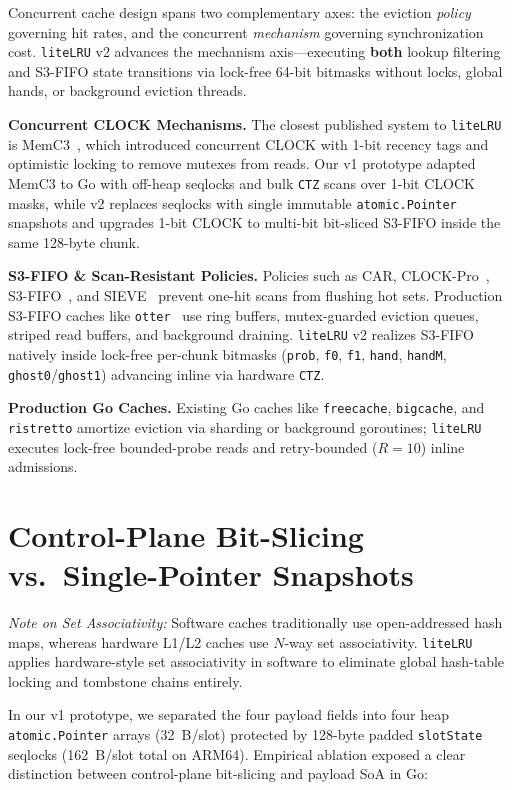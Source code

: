 \documentclass[11pt,a4paper]{article}
\begin{document}
Concurrent cache design spans two complementary axes: the eviction \textit{policy} governing hit rates, and the concurrent \textit{mechanism} governing synchronization cost. \texttt{liteLRU} v2 advances the mechanism axis---executing \textbf{both} lookup filtering and S3-FIFO state transitions via lock-free 64-bit bitmasks without locks, global hands, or background eviction threads.

\textbf{Concurrent CLOCK Mechanisms.} The closest published system to \texttt{liteLRU} is MemC3~\cite{memc3}, which introduced concurrent CLOCK with 1-bit recency tags and optimistic locking to remove mutexes from reads. Our v1 prototype adapted MemC3 to Go with off-heap seqlocks and bulk \texttt{CTZ} scans over 1-bit CLOCK masks, while v2 replaces seqlocks with single immutable \texttt{atomic.Pointer} snapshots and upgrades 1-bit CLOCK to multi-bit bit-sliced S3-FIFO inside the same 128-byte chunk.

\textbf{S3-FIFO \& Scan-Resistant Policies.} Policies such as CAR, CLOCK-Pro~\cite{clockpro2005}, S3-FIFO~\cite{s3fifo2023}, and SIEVE~\cite{sieve2024} prevent one-hit scans from flushing hot sets. Production S3-FIFO caches like \texttt{otter}~\cite{otter} use ring buffers, mutex-guarded eviction queues, striped read buffers, and background draining. \texttt{liteLRU} v2 realizes S3-FIFO natively inside lock-free per-chunk bitmasks (\texttt{prob}, \texttt{f0}, \texttt{f1}, \texttt{hand}, \texttt{handM}, \texttt{ghost0}/\texttt{ghost1}) advancing inline via hardware \texttt{CTZ}.

\textbf{Production Go Caches.} Existing Go caches like \texttt{freecache}, \texttt{bigcache}, and \texttt{ristretto} amortize eviction via sharding or background goroutines; \texttt{liteLRU} executes lock-free bounded-probe reads and retry-bounded ($R=10$) inline admissions.

\section{Control-Plane Bit-Slicing vs.\ Single-Pointer Snapshots}
\label{sec:soa}

\textit{Note on Set Associativity:} Software caches traditionally use open-addressed hash maps, whereas hardware L1/L2 caches use $N$-way set associativity. \texttt{liteLRU} applies hardware-style set associativity in software to eliminate global hash-table locking and tombstone chains entirely.

In our v1 prototype, we separated the four payload fields into four heap \texttt{atomic.Pointer} arrays (32~B/slot) protected by 128-byte padded \texttt{slotState} seqlocks (162~B/slot total on ARM64). Empirical ablation exposed a clear distinction between control-plane bit-slicing and payload SoA in Go:
\end{document}
